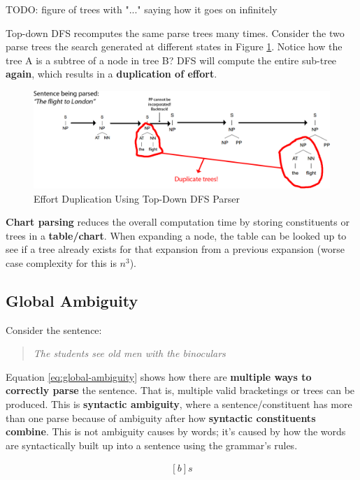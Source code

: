 \documentclass{article}
\begin{document}
TODO: figure of trees with "..." saying how it goes on infinitely

Top-down DFS recomputes the same parse trees many times. Consider the two parse trees the search generated at different states in Figure \ref{fig:effort-duplication}. Notice how the tree A is a subtree of a node in tree B? DFS will compute the entire sub-tree \textbf{again}, which results in a \textbf{duplication of effort}.

\begin{figure}
	\centering
	\includegraphics[scale=0.3]{figures/parsing-effort-duplication.png}
	\caption{Effort Duplication Using Top-Down DFS Parser}
	\label{fig:effort-duplication}
\end{figure}

\textbf{Chart parsing} reduces the overall computation time by storing constituents or trees in a \textbf{table/chart}. When expanding a node, the table can be looked up to see if a tree already exists for that expansion from a previous expansion (worse case complexity for this is $n^3$).

\subsection{Global Ambiguity}

Consider the sentence:
\begin{quote}
	\textit{The students see old men with the binoculars}
\end{quote}
Equation \ref{eq:global-ambiguity} shows how there are \textbf{multiple ways to correctly parse} the sentence. That is, multiple valid bracketings or trees can be produced. This is \textbf{syntactic ambiguity}, where a sentence/constituent has more than one parse because of ambiguity after how \textbf{syntactic constituents combine}. This is not ambiguity causes by words; it's caused by how the words are syntactically built up into a sentence using the grammar's rules.

\begin{equation}
\begin{aligned}[b]
s
\end{aligned}
\end{equation}
\end{document}
